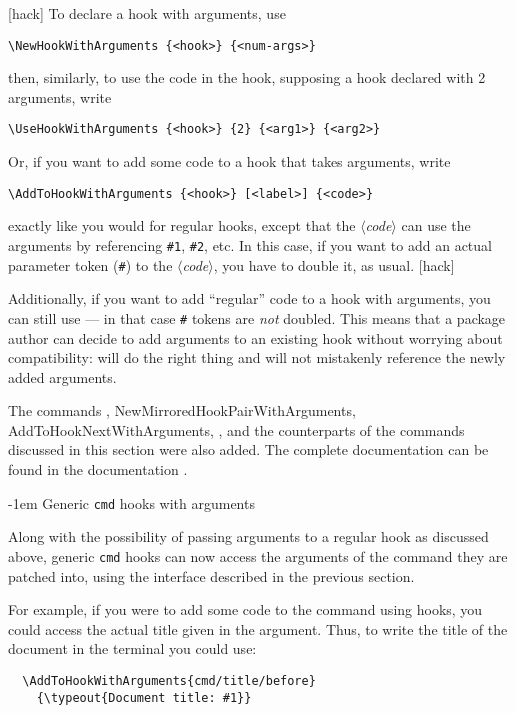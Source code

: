 \documentclass{ltnews}
\makeatletter
\providecommand\hook[1]{\texttt{#1}}
\providecommand\meta[1]{$\langle$\textrm{\itshape#1}$\rangle$}
\renewcommand{\subsubsection}{%
   \@startsection      {subsubsection}{2}{0pt}{1.5ex \@plus 1ex \@minus .2ex}%
      {-1em}{\@subheadingfont\colonize}%
}
\providecommand\colonize[1]{#1:}
\makeatother
\begin{document}
[hack]{\small}
To declare a hook with arguments, use
\begin{verbatim}
\NewHookWithArguments {<hook>} {<num-args>}
\end{verbatim}
then, similarly, to use the code in the hook, supposing a hook declared
with 2 arguments, write
\begin{verbatim}
\UseHookWithArguments {<hook>} {2} {<arg1>} {<arg2>}
\end{verbatim}

Or, if you want to add some code to a hook that takes arguments, write
\begin{verbatim}
\AddToHookWithArguments {<hook>} [<label>] {<code>}
\end{verbatim}
exactly like you would for regular hooks, except that the \meta{code}
can use the arguments by referencing \verb|#1|, \verb|#2|, etc.  In this
case, if you want to add an actual parameter token (\verb|#|) to the
\meta{code}, you have to double it, as usual.
[hack]

Additionally, if you want to add \enquote{regular} code to a hook with
arguments, you can still use  --- in that case \verb|#|
tokens are \emph{not} doubled.  This means that a package author can
decide to add arguments to an existing hook without worrying about
compatibility:  will do the right thing and will not
mistakenly reference the newly added arguments.

The commands , \cs
{NewMirroredHookPairWithArguments}, \cs
{AddToHookNextWithArguments}, , and
the  counterparts of the commands discussed in this section
were also added.  The complete documentation can be found in the
 documentation \cite{37:lthooks-doc}.

\subsubsection{Generic \texttt{cmd} hooks with arguments}

Along with the possibility of passing arguments to a regular hook as
discussed above, generic \hook{cmd} hooks can now access the arguments
of the command they are patched into, using the interface described in
the previous section.

For example, if you were to add some code to the  command
using hooks, you could access the actual title given in the argument.
Thus, to write the title of the document in the terminal you
could use:
\begin{verbatim}
  \AddToHookWithArguments{cmd/title/before}
    {\typeout{Document title: #1}}
\end{verbatim}
\end{document}
